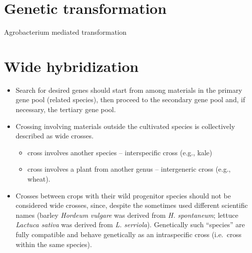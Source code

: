 \documentclass[
  ignorenonframetext,
  aspectratio=169]{beamer}
\providecommand{\tightlist}{%
  \setlength{\itemsep}{0pt}\setlength{\parskip}{0pt}}
\begin{document}
\hypertarget{genetic-transformation}{%
\section{Genetic transformation}\label{genetic-transformation}}

\begin{frame}{Agrobacterium mediated transformation}
\protect\hypertarget{agrobacterium-mediated-transformation}{}
\end{frame}

\hypertarget{wide-hybridization}{%
\section{Wide hybridization}\label{wide-hybridization}}

\begin{frame}{}
\protect\hypertarget{section-15}{}
\begin{itemize}
\tightlist
\item
  Search for desired genes should start from among materials in the
  primary gene pool (related species), then proceed to the secondary
  gene pool and, if necessary, the tertiary gene pool.
\item
  Crossing involving materials outside the cultivated species is
  collectively described as wide crosses.

  \begin{itemize}
  \tightlist
  \item
    cross involves another species -- interspecific cross (e.g., kale)
  \item
    cross involves a plant from another genus -- intergeneric cross
    (e.g., wheat).
  \end{itemize}
\item
  Crosses between crops with their wild progenitor species should not be
  considered wide crosses, since, despite the sometimes used different
  scientific names (barley \emph{Hordeum vulgare} was derived from
  \emph{H. spontaneum}; lettuce \emph{Lactuca sativa} was derived from
  \emph{L. serriola}). Genetically such ``species'' are fully compatible
  and behave genetically as an intraspecific cross (i.e.~cross within
  the same species).
\end{itemize}
\end{frame}
\end{document}
